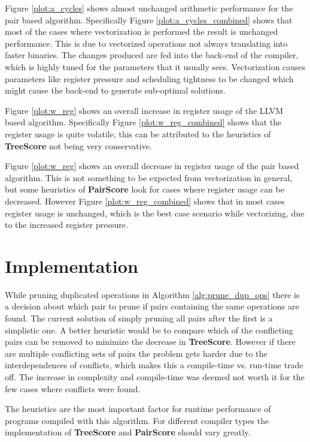 \documentclass[12pt,a4paper,onecolumn,twoside,openright]{report}
\begin{document}
Figure \ref{plot:a_cycles} shows almost unchanged arithmetic performance for the pair based algorithm. Specifically Figure \ref{plot:a_cycles_combined} shows that most of the cases where vectorization is performed the result is unchanged performance. This is due to vectorized operations not always translating into faster binaries. The changes produced are fed into the back-end of the compiler, which is highly tuned for the parameters that it usually sees. Vectorization causes parameters like register pressure and scheduling tightness to be changed which might cause the back-end to generate sub-optimal solutions.

Figure \ref{plot:w_reg} shows an overall increase in register usage of the LLVM based algorithm. Specifically Figure \ref{plot:w_reg_combined} shows that the register usage is quite volatile, this can be attributed to the heuristics of \textbf{TreeScore} not being very conservative.

Figure \ref{plot:w_reg} shows an overall decrease in register usage of the pair based algorithm. This is not something to be expected from vectorization in general, but some heuristics of \textbf{PairScore} look for cases where register usage can be decreased. However Figure \ref{plot:w_reg_combined} shows that in most cases register usage is unchanged, which is the best case scenario while vectorizing, due to the increased register pressure.




\section{Implementation}
While pruning duplicated operations in Algorithm \ref{alg:prune_dup_ops} there is a decision about which pair to prune if pairs containing the same operations are found. The current solution of simply pruning all pairs after the first is a simplistic one. A better heuristic would be to compare which of the conflicting pairs can be removed to minimize the decrease in \textbf{TreeScore}. However if there are multiple conflicting sets of pairs the problem gets harder due to the interdependences of conflicts, which makes this a compile-time vs. run-time trade off. The increase in complexity and compile-time was deemed not worth it for the few cases where conflicts were found.


The heuristics are the most important factor for runtime performance of programs compiled with this algorithm. For different compiler types the implementation of \textbf{TreeScore} and \textbf{PairScore} should vary greatly. 
\end{document}
